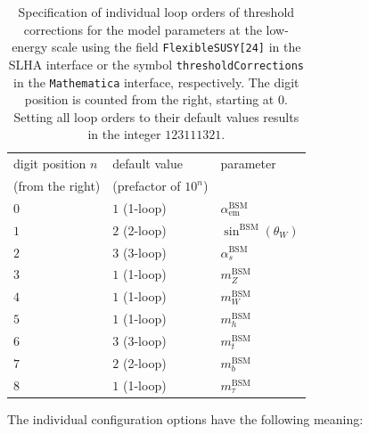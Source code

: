 \documentclass[final,3p,11pt,pdflatex]{elsarticle}
\newcommand{\mathematica}{\texttt{Ma\-the\-ma\-ti\-ca}\xspace}
\newcommand{\BSM}{\ensuremath{\text{BSM}}\xspace}
\def\as{\alpha_s}
\begin{document}
%
\begin{table}[tbh]
  \centering
  \begin{tabular}{lll}
    \toprule
    digit position $n$    & default value & parameter \\
    (from the right) & (prefactor of $10^n$) & \\
    \midrule
    $0$ & $1$ (1-loop) & $\alpha^\BSM_{\text{em}}$ \\
    $1$ & $2$ (2-loop) & $\sin^\BSM(\theta_W)$ \\
    $2$ & $3$ (3-loop) & $\as^\BSM$ \\
    $3$ & $1$ (1-loop) & $m^\BSM_Z$ \\
    $4$ & $1$ (1-loop) & $m^\BSM_W$ \\
    $5$ & $1$ (1-loop) & $m^\BSM_h$ \\
    $6$ & $3$ (3-loop) & $m^\BSM_t$ \\
    $7$ & $2$ (2-loop) & $m^\BSM_b$ \\
    $8$ & $1$ (1-loop) & $m^\BSM_\tau$ \\
    \bottomrule
  \end{tabular}
  \caption{Specification of individual loop orders of threshold
    corrections for the model parameters at the low-energy scale using
    the field \texttt{FlexibleSUSY[24]} in the SLHA interface or the
    symbol \texttt{thresholdCorrections} in the \mathematica
    interface, respectively.  The digit position is counted from the
    right, starting at $0$.  Setting all loop orders to their default
    values results in the integer $123111321$.}
  \label{tab:sg_mma_tc}
\end{table}
%
The individual configuration options have the following meaning:
%
\end{document}
